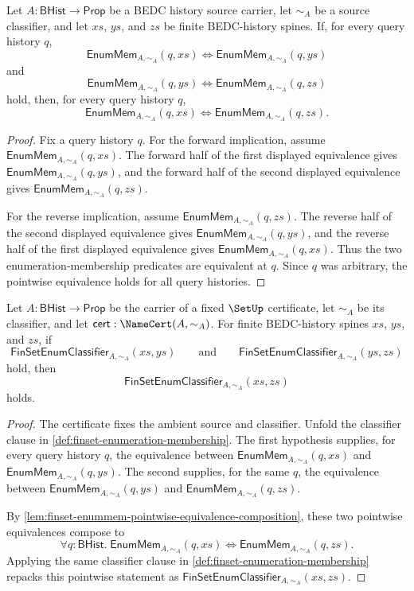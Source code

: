 \begin{lemma}
\label{lem:finset-enummem-pointwise-equivalence-composition}
Let $A:\mathsf{BHist}\to\mathsf{Prop}$ be a BEDC history source carrier, let $\sim_A$ be a source classifier, and let $xs$, $ys$, and $zs$ be finite BEDC-history spines. If, for every query history $q$,
$$
\mathsf{EnumMem}_{A,\sim_A}(q,xs)
\Longleftrightarrow
\mathsf{EnumMem}_{A,\sim_A}(q,ys)
$$
and
$$
\mathsf{EnumMem}_{A,\sim_A}(q,ys)
\Longleftrightarrow
\mathsf{EnumMem}_{A,\sim_A}(q,zs)
$$
hold, then, for every query history $q$,
$$
\mathsf{EnumMem}_{A,\sim_A}(q,xs)
\Longleftrightarrow
\mathsf{EnumMem}_{A,\sim_A}(q,zs).
$$
\end{lemma}
\begin{proof}
Fix a query history $q$. For the forward implication, assume $\mathsf{EnumMem}_{A,\sim_A}(q,xs)$. The forward half of the first displayed equivalence gives $\mathsf{EnumMem}_{A,\sim_A}(q,ys)$, and the forward half of the second displayed equivalence gives $\mathsf{EnumMem}_{A,\sim_A}(q,zs)$.

For the reverse implication, assume $\mathsf{EnumMem}_{A,\sim_A}(q,zs)$. The reverse half of the second displayed equivalence gives $\mathsf{EnumMem}_{A,\sim_A}(q,ys)$, and the reverse half of the first displayed equivalence gives $\mathsf{EnumMem}_{A,\sim_A}(q,xs)$. Thus the two enumeration-membership predicates are equivalent at $q$. Since $q$ was arbitrary, the pointwise equivalence holds for all query histories.
\end{proof}

\begin{theorem}
\label{thm:finset-enumeration-classifier-transitivity}
Let $A:\mathsf{BHist}\to\mathsf{Prop}$ be the carrier of a fixed $\SetUp$ certificate, let $\sim_A$ be its classifier, and let $\mathsf{cert}:\NameCert(A,\sim_A)$. For finite BEDC-history spines $xs$, $ys$, and $zs$, if
$$
\mathsf{FinSetEnumClassifier}_{A,\sim_A}(xs,ys)
\qquad\text{and}\qquad
\mathsf{FinSetEnumClassifier}_{A,\sim_A}(ys,zs)
$$
hold, then
$$
\mathsf{FinSetEnumClassifier}_{A,\sim_A}(xs,zs)
$$
holds.
\end{theorem}
\begin{proof}
The certificate fixes the ambient source and classifier. Unfold the classifier clause in \autoref{def:finset-enumeration-membership}. The first hypothesis supplies, for every query history $q$, the equivalence between $\mathsf{EnumMem}_{A,\sim_A}(q,xs)$ and $\mathsf{EnumMem}_{A,\sim_A}(q,ys)$. The second supplies, for the same $q$, the equivalence between $\mathsf{EnumMem}_{A,\sim_A}(q,ys)$ and $\mathsf{EnumMem}_{A,\sim_A}(q,zs)$.

By \autoref{lem:finset-enummem-pointwise-equivalence-composition}, these two pointwise equivalences compose to
$$
\forall q:\mathsf{BHist}.\;
\mathsf{EnumMem}_{A,\sim_A}(q,xs)
\Longleftrightarrow
\mathsf{EnumMem}_{A,\sim_A}(q,zs).
$$
Applying the same classifier clause in \autoref{def:finset-enumeration-membership} repacks this pointwise statement as $\mathsf{FinSetEnumClassifier}_{A,\sim_A}(xs,zs)$.
\end{proof}

